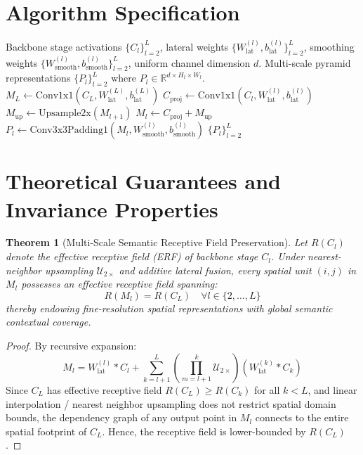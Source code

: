 \documentclass[11pt,a4paper]{article}
\newtheorem{theorem}{Theorem}
\theoremstyle{definition}
\begin{document}
\section{Algorithm Specification}

\begin{algorithm}[H]
\caption{Feature Pyramid Network Multi-Scale Feature Construction}
\label{alg:fpn}
\begin{algorithmic}[1]
\Require Backbone stage activations $\{C_l\}_{l=2}^L$, lateral weights $\{W_{\text{lat}}^{(l)}, b_{\text{lat}}^{(l)}\}_{l=2}^L$, smoothing weights $\{W_{\text{smooth}}^{(l)}, b_{\text{smooth}}^{(l)}\}_{l=2}^L$, uniform channel dimension $d$.
\Ensure Multi-scale pyramid representations $\{P_l\}_{l=2}^L$ where $P_l \in \mathbb{R}^{d \times H_l \times W_l}$.
\State $M_L \gets \text{Conv1x1}(C_L, W_{\text{lat}}^{(L)}, b_{\text{lat}}^{(L)})$
    \State $C_{\text{proj}} \gets \text{Conv1x1}(C_l, W_{\text{lat}}^{(l)}, b_{\text{lat}}^{(l)})$
    \State $M_{\text{up}} \gets \text{Upsample2x}(M_{l+1})$
    \State $M_l \gets C_{\text{proj}} + M_{\text{up}}$
\EndFor
{}
    \State $P_l \gets \text{Conv3x3Padding1}(M_l, W_{\text{smooth}}^{(l)}, b_{\text{smooth}}^{(l)})$
\EndFor
\State \Return $\{P_l\}_{l=2}^L$
\end{algorithmic}
\end{algorithm}

\section{Theoretical Guarantees and Invariance Properties}

\begin{theorem}[Multi-Scale Semantic Receptive Field Preservation]
\label{thm:receptive_field}
Let $R(C_l)$ denote the effective receptive field (ERF) of backbone stage $C_l$. Under nearest-neighbor upsampling $\mathcal{U}_{2\times}$ and additive lateral fusion, every spatial unit $(i, j)$ in $M_l$ possesses an effective receptive field spanning:
\begin{equation}
R(M_l) = R(C_L) \quad \forall l \in \{2, \dots, L\}
\end{equation}
thereby endowing fine-resolution spatial representations with global semantic contextual coverage.
\end{theorem}

\begin{proof}
By recursive expansion:
\begin{equation}
M_l = W_{\text{lat}}^{(l)} * C_l + \sum_{k=l+1}^L \left( \prod_{m=l+1}^k \mathcal{U}_{2\times} \right) \left( W_{\text{lat}}^{(k)} * C_k \right)
\end{equation}
Since $C_L$ has effective receptive field $R(C_L) \ge R(C_k)$ for all $k < L$, and linear interpolation / nearest neighbor upsampling does not restrict spatial domain bounds, the dependency graph of any output point in $M_l$ connects to the entire spatial footprint of $C_L$. Hence, the receptive field is lower-bounded by $R(C_L)$.
\end{proof}
\end{document}
